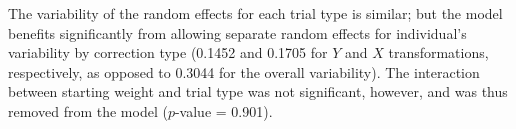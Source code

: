 \documentclass[12pt]{article}\usepackage[]{graphicx}\usepackage[]{color}
\begin{document}
\begin{appendix}
The variability of the random effects for each trial type is similar; but the model benefits significantly from allowing separate random effects for individual's variability by correction type (0.1452 and 0.1705 for $Y$ and $X$ transformations, respectively, as opposed to 0.3044 for the overall variability). The interaction between starting weight and trial type was not significant, however, and was thus removed from the model ($p$-value = 0.901).

\end{appendix}
\end{document}
